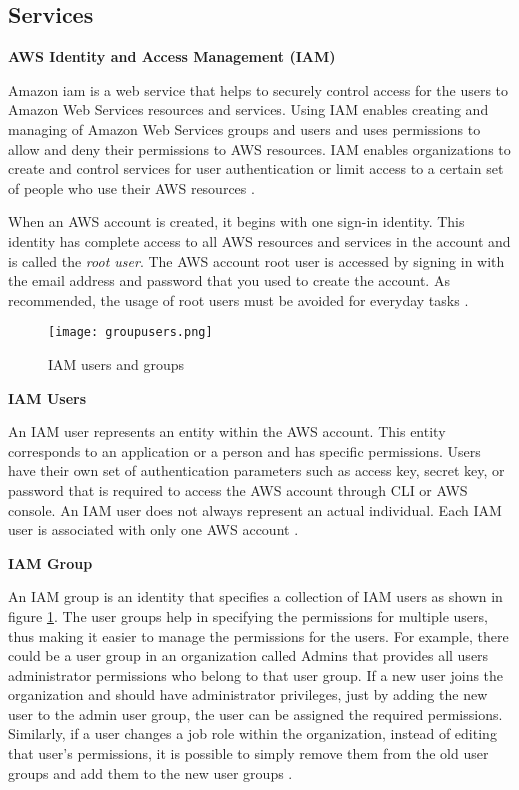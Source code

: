 \subsection{Services}

\textbf{AWS Identity and Access Management (IAM)}

\par Amazon \gls{iam} is a web service that helps to
securely
control access for the users to Amazon Web Services resources and services.
Using IAM enables creating and managing of Amazon Web
Services groups and users and uses permissions to allow and deny their permissions to AWS resources.
IAM enables organizations to create and control services
for user authentication or limit access to a certain set of people who use their AWS resources \cite{24}.


\par When an AWS account is created, it begins with one
sign-in identity.
This identity has
complete access to all AWS resources and services in the account and is called the \textit{root user}.
The AWS account root
user is accessed by signing in with the email address and password that you used to create the account.
As
recommended, the usage of root users must be avoided for
everyday tasks \cite{25}.


\begin{figure}
    \centering
    \texttt{[image: groupusers.png]}
    \caption{IAM users and groups}{\cite{26}}
    \label{fig:groupusers}
\end{figure}

\textbf{IAM Users}

\par An IAM user represents an entity within the AWS account.
This entity corresponds to an application or a person and has specific permissions.
Users have their own set of authentication parameters such as access key, secret key, or password that is required to access the AWS account through CLI or AWS console.
An IAM user does not always represent an actual individual.
Each IAM user is associated with only one AWS account
\cite{27}.
\hfill \break

\textbf{IAM Group}
\par An IAM group is an identity that specifies a 
collection of IAM users as shown in figure \ref{fig:groupusers}.
The user
groups help in specifying the permissions for multiple users, thus making it easier to manage the permissions for the users.
For example, there could be a user group in an organization called Admins that provides all users administrator permissions who belong to that user group.
If a new user joins the organization and should have administrator privileges, just by adding the new user to the admin user group, the user can be assigned the required permissions.
Similarly, if a user changes a job role within the organization, instead of editing that user’s permissions, it is possible to simply remove them from the old user groups and add them to the new user groups \cite{27}.
\hfill \break


